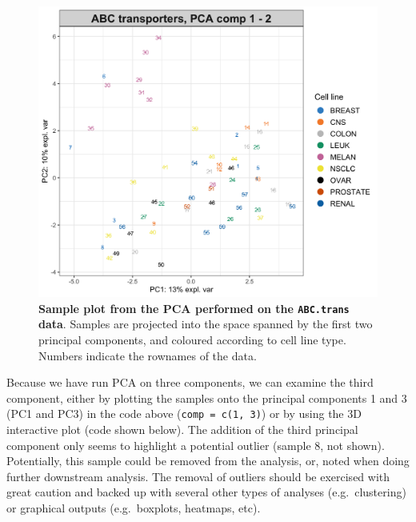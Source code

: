 \documentclass[]{book}
\newenvironment{Shaded}{\begin{snugshade}}{\end{snugshade}}
\newcommand{\CommentTok}[1]{\textcolor[rgb]{0.56,0.35,0.01}{\textit{#1}}}
\newcommand{\DataTypeTok}[1]{\textcolor[rgb]{0.13,0.29,0.53}{#1}}
\newcommand{\KeywordTok}[1]{\textcolor[rgb]{0.13,0.29,0.53}{\textbf{#1}}}
\newcommand{\NormalTok}[1]{#1}
\newcommand{\OperatorTok}[1]{\textcolor[rgb]{0.81,0.36,0.00}{\textbf{#1}}}
\newcommand{\StringTok}[1]{\textcolor[rgb]{0.31,0.60,0.02}{#1}}
\begin{document}
\begin{figure}

{\centering \includegraphics[width=0.5\linewidth]{Figures/PCA/pca-ABCtrans-group-1} 

}

\caption{\textbf{Sample plot from the PCA performed on the \texttt{ABC.trans} data}. Samples are projected into the space spanned by the first two principal components, and coloured according to cell line type. Numbers indicate the rownames of the data.}\label{fig:pca-ABCtrans-group}
\end{figure}



Because we have run PCA on three components, we can examine the third component, either by plotting the samples onto the principal components 1 and 3 (PC1 and PC3) in the code above (\texttt{comp\ =\ c(1,\ 3)}) or by using the 3D interactive plot (code shown below). The addition of the third principal component only seems to highlight a potential outlier (sample 8, not shown). Potentially, this sample could be removed from the analysis, or, noted when doing further downstream analysis. The removal of outliers should be exercised with great caution and backed up with several other types of analyses (e.g.~clustering) or graphical outputs (e.g.~boxplots, heatmaps, etc).

\begin{Shaded}
\end{Shaded}
\end{document}
